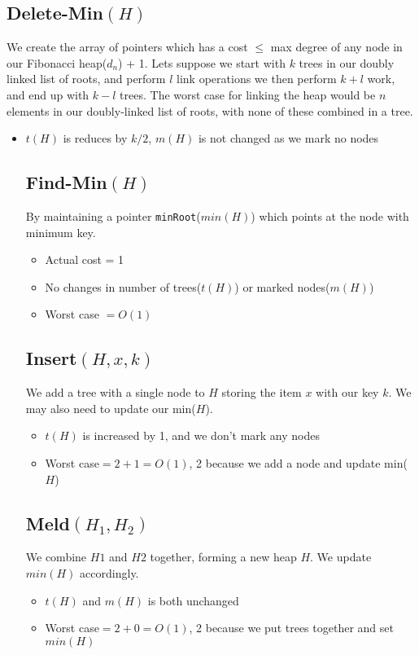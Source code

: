 \documentclass[a4paper,oneside,11pt]{article}
\begin{document}
\subsection*{Delete-Min$(H)$}
We create the array of pointers which has a cost $\leq$ max degree of any node in our Fibonacci heap($d_n$) + 1.
Lets suppose we start with $k$ trees in our doubly linked list of roots, and perform $l$ link operations we then perform $k+l$ work, and end up with $k-l$ trees.
The worst case for linking the heap would be $n$ elements in our doubly-linked list of roots, with none of these combined in a tree.
\begin{itemize}
\item{$t(H)$ is reduces by $k/2$, $m(H)$ is not changed as we mark no nodes}

\subsection*{Find-Min$(H)$}
By maintaining a pointer \texttt{minRoot}($min(H)$) which points at the node with minimum key.
\begin{itemize}
\item{Actual cost} = 1
\item{No changes in number of trees($t(H)$) or marked nodes($m(H)$)}
\item{Worst case} $= O(1)$
\end{itemize}
\subsection*{Insert$(H,x,k)$}
We add a tree with a single node to $H$ storing the item $x$ with our key $k$. We may also need to update our min($H$).

\begin{itemize}
\item{$t(H)$ is increased by 1, and we don't mark any nodes}
\item{Worst case}$ = 2 + 1 = O(1)$, 2 because we add a node and update min($H$)
\end{itemize}
\subsection*{Meld$(H_1, H_2)$}
We combine $H1$ and $H2$ together, forming a new heap $H$. We update $min(H)$ accordingly.

\begin{itemize}
\item{$t(H)$ and $m(H)$ is both unchanged}
\item{Worst case}$ = 2 + 0 = O(1)$, 2 because we put trees together and set $min(H)$
\end{itemize}

\end{itemize}
\end{document}

